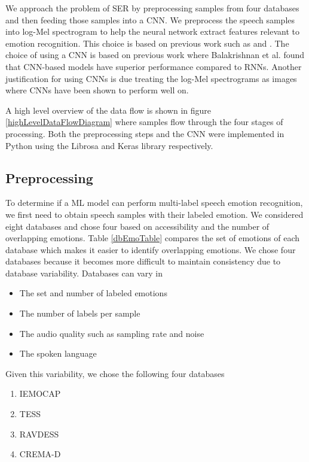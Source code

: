\documentclass[conference]{IEEEtran}
\begin{document}
We approach the problem of SER by preprocessing samples from four databases and then feeding those samples into a CNN. We preprocess the speech samples into log-Mel spectrogram to help the neural network extract features relevant to emotion recognition. This choice is based on previous work such as \cite{Engel2019} and \cite{Badshah2017}. The choice of using a CNN is based on previous work where Balakrishnan et al. \cite{Balakrishnan2017} found that CNN-based models have superior performance compared to RNNs. Another justification for using CNNs is due treating the log-Mel spectrograms as images where CNNs have been shown to perform well on.\cite{Krizhevsky2012}

A high level overview of the data flow is shown in figure \ref{highLevelDataFlowDiagram} where samples flow through the four stages of processing. Both the preprocessing steps and the CNN were implemented in Python using the Librosa \cite{McFee2015} and Keras \cite{Chollet2015} library respectively.

\subsection{Preprocessing}

To determine if a ML model can perform multi-label speech emotion recognition, we first need to obtain speech samples with their labeled emotion. We considered eight databases and chose four based on accessibility and the number of overlapping emotions. Table \ref{dbEmoTable} compares the set of emotions of each database which makes it easier to identify overlapping emotions. We chose four databases because it becomes more difficult to maintain consistency due to database variability. Databases can vary in
\begin{itemize}
	\item The set and number of labeled emotions
	\item The number of labels per sample
	\item The audio quality such as sampling rate and noise
	\item The spoken language
\end{itemize}
Given this variability, we chose the following four databases
\begin{enumerate}
	\item IEMOCAP \cite{busso_2008}
	\item TESS \cite{dupuis_2011}
	\item RAVDESS \cite{livingstone_2018}
	\item CREMA-D \cite{cao_2014}
\end{enumerate}
\end{document}
